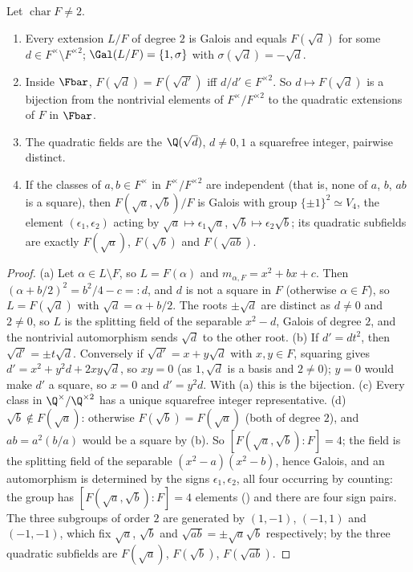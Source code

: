 \begin{proposition}\label{prop:galois:quadratic}
Let $\operatorname{char}F\ne2$.
\begin{enumerate}[label=(\alph*)]
\item Every extension $L/F$ of degree $2$ is Galois and equals $F(\sqrt d)$ for some $d\in F^\times\setminus F^{\times2}$; $\Gal(L/F)=\{1,\sigma\}$ with
$\sigma(\sqrt d)=-\sqrt d$.
\item Inside $\Fbar$, $F(\sqrt d)=F(\sqrt{d'})$ iff $d/d'\in F^{\times2}$. So $d\mapsto F(\sqrt d)$ is a bijection from the nontrivial elements of
$F^\times/F^{\times2}$ to the quadratic extensions of $F$ in $\Fbar$.
\item The quadratic fields are the $\Q(\sqrt d)$, $d\ne0,1$ a squarefree integer, pairwise distinct.
\item If the classes of $a,b\in F^\times$ in $F^\times/F^{\times2}$ are independent (that is, none of $a$, $b$, $ab$ is a square), then $F(\sqrt a,\sqrt b)/F$ is
Galois with group $\{\pm1\}^2\simeq V_4$, the element $(\epsilon_1,\epsilon_2)$ acting by $\sqrt a\mapsto\epsilon_1\sqrt a$, $\sqrt b\mapsto\epsilon_2\sqrt b$; its
quadratic subfields are exactly $F(\sqrt a)$, $F(\sqrt b)$ and $F(\sqrt{ab})$.
\end{enumerate}
\end{proposition}

\begin{proof}
(a) Let $\alpha\in L\setminus F$, so $L=F(\alpha)$ and $m_{\alpha,F}=x^2+bx+c$. Then $(\alpha+b/2)^2=b^2/4-c=:d$, and $d$ is not a square in $F$ (otherwise
$\alpha\in F$), so $L=F(\sqrt d)$ with $\sqrt d=\alpha+b/2$. The roots $\pm\sqrt d$ are distinct as $d\ne0$ and $2\ne0$, so $L$ is the splitting field of the
separable $x^2-d$, Galois of degree $2$, and the nontrivial automorphism sends $\sqrt d$ to the other root.
(b) If $d'=dt^2$, then $\sqrt{d'}=\pm t\sqrt d$. Conversely if $\sqrt{d'}=x+y\sqrt d$ with $x,y\in F$, squaring gives $d'=x^2+y^2d+2xy\sqrt d$, so $xy=0$
(as $1,\sqrt d$ is a basis and $2\ne0$); $y=0$ would
make $d'$ a square, so $x=0$ and $d'=y^2d$. With (a) this is the bijection.
(c) Every class in $\Q^\times/\Q^{\times2}$ has a unique squarefree integer representative.
(d) $\sqrt b\notin F(\sqrt a)$: otherwise $F(\sqrt b)=F(\sqrt a)$ (both of degree $2$), and $ab=a^2(b/a)$ would be a square by (b). So $[F(\sqrt a,\sqrt b):F]=4$; the
field is the splitting field of the separable $(x^2-a)(x^2-b)$, hence Galois, and an automorphism is determined by the signs $\epsilon_1,\epsilon_2$, all four
occurring by counting: the group has $[F(\sqrt a,\sqrt b):F]=4$ elements () and there are four sign pairs. The three
subgroups of order $2$ are generated by $(1,-1)$, $(-1,1)$ and $(-1,-1)$, which fix $\sqrt a$, $\sqrt b$ and $\sqrt{ab}=\pm\sqrt a\sqrt b$ respectively; by  the three quadratic
subfields are $F(\sqrt a)$, $F(\sqrt b)$, $F(\sqrt{ab})$.
\end{proof}

